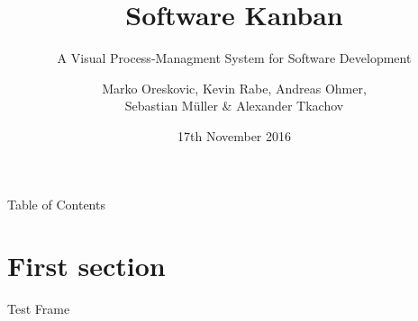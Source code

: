 \documentclass[14pt,t]{beamer}
\title{Software Kanban}
\subtitle{A Visual Process-Managment System for Software Development}
\author{{\footnotesize Marko Oreskovic, Kevin Rabe, Andreas Ohmer,\\ Sebastian Müller \& Alexander Tkachov}}
\institute{Frankfurt Univerity of Applied Sciences}
\date{\small 17th November 2016}
\begin{document}
	\maketitle
	
	\begin{frame}{Table of Contents}
		\tableofcontents[hideallsubsections]
	\end{frame}
	
	\section{First section}
		\begin{frame}{\secname}
			Test Frame
		\end{frame}
	
\end{document}
